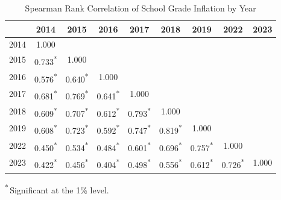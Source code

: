 
\begin{table}[ht]
\centering
\caption{Spearman Rank Correlation of School Grade Inflation by Year}
\label{tab:spearman_corr}
\begin{tabular}{l *{8}c}
\toprule
 & \multicolumn{1}{c}{2014} & \multicolumn{1}{c}{2015} & \multicolumn{1}{c}{2016} & \multicolumn{1}{c}{2017} & \multicolumn{1}{c}{2018} & \multicolumn{1}{c}{2019} & \multicolumn{1}{c}{2022} & \multicolumn{1}{c}{2023} \\
\midrule
2014 & 1.000  &         &         &         &         &         &         &         \\
2015 & 0.733\textsuperscript{*} & 1.000  &         &         &         &         &         &         \\
2016 & 0.576\textsuperscript{*} & 0.640\textsuperscript{*} & 1.000  &         &         &         &         &         \\
2017 & 0.681\textsuperscript{*} & 0.769\textsuperscript{*} & 0.641\textsuperscript{*} & 1.000  &         &         &         &         \\
2018 & 0.609\textsuperscript{*} & 0.707\textsuperscript{*} & 0.612\textsuperscript{*} & 0.793\textsuperscript{*} & 1.000  &         &         &         \\
2019 & 0.608\textsuperscript{*} & 0.723\textsuperscript{*} & 0.592\textsuperscript{*} & 0.747\textsuperscript{*} & 0.819\textsuperscript{*} & 1.000  &         &         \\
2022 & 0.450\textsuperscript{*} & 0.534\textsuperscript{*} & 0.484\textsuperscript{*} & 0.601\textsuperscript{*} & 0.696\textsuperscript{*} & 0.757\textsuperscript{*} & 1.000  &         \\
2023 & 0.422\textsuperscript{*} & 0.456\textsuperscript{*} & 0.404\textsuperscript{*} & 0.498\textsuperscript{*} & 0.556\textsuperscript{*} & 0.612\textsuperscript{*} & 0.726\textsuperscript{*} & 1.000  \\
\bottomrule
\end{tabular}

\vspace{0.5em}
\raggedright
\textsuperscript{*}\,Significant at the 1\% level.
\end{table}